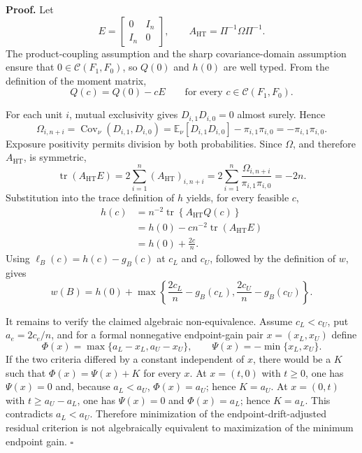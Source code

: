 \textbf{Proof.}
Let
\[
E=\begin{bmatrix}0&I_n\\ I_n&0\end{bmatrix},
\qquad
A_{\mathrm{HT}}=\Pi^{-1}\Omega\Pi^{-1}.
\]
The product-coupling assumption and the sharp covariance-domain assumption ensure that \(0\in\mathcal C(F_1,F_0)\), so \(Q(0)\) and \(h(0)\) are well typed.  From the definition of the moment matrix,
\[
Q(c)=Q(0)-cE
\qquad\text{for every }c\in\mathcal C(F_1,F_0).
\]

For each unit \(i\), mutual exclusivity gives \(D_{i,1}D_{i,0}=0\) almost surely.  Hence
\[
\Omega_{i,n+i}
=\operatorname{Cov}_\nu(D_{i,1},D_{i,0})
=\mathbb E_\nu[D_{i,1}D_{i,0}]-\pi_{i,1}\pi_{i,0}
=-\pi_{i,1}\pi_{i,0}.
\]
Exposure positivity permits division by both probabilities.  Since \(\Omega\), and therefore \(A_{\mathrm{HT}}\), is symmetric,
\[
\operatorname{tr}(A_{\mathrm{HT}}E)
=2\sum_{i=1}^n(A_{\mathrm{HT}})_{i,n+i}
=2\sum_{i=1}^n\frac{\Omega_{i,n+i}}{\pi_{i,1}\pi_{i,0}}
=-2n.
\]
Substitution into the trace definition of \(h\) yields, for every feasible \(c\),
\[
\begin{aligned}
h(c)
&=n^{-2}\operatorname{tr}\!\left\{A_{\mathrm{HT}}Q(c)\right\}\\
&=h(0)-cn^{-2}\operatorname{tr}(A_{\mathrm{HT}}E)\\
&=h(0)+\frac{2c}{n}.
\end{aligned}
\]
Using \(\ell_B(c)=h(c)-g_B(c)\) at \(c_L\) and \(c_U\), followed by the definition of \(w\), gives
\[
w(B)=h(0)+\max\left\{\frac{2c_L}{n}-g_B(c_L),\frac{2c_U}{n}-g_B(c_U)\right\}.
\]

It remains to verify the claimed algebraic non-equivalence.  Assume \(c_L<c_U\), put \(a_e=2c_e/n\), and for a formal nonnegative endpoint-gain pair \(x=(x_L,x_U)\) define
\[
\Phi(x)=\max\{a_L-x_L,a_U-x_U\},
\qquad
\Psi(x)=-\min\{x_L,x_U\}.
\]
If the two criteria differed by a constant independent of \(x\), there would be a \(K\) such that \(\Phi(x)=\Psi(x)+K\) for every \(x\).  At \(x=(t,0)\) with \(t\ge0\), one has \(\Psi(x)=0\) and, because \(a_L<a_U\), \(\Phi(x)=a_U\); hence \(K=a_U\).  At \(x=(0,t)\) with \(t\ge a_U-a_L\), one has \(\Psi(x)=0\) and \(\Phi(x)=a_L\); hence \(K=a_L\).  This contradicts \(a_L<a_U\).  Therefore minimization of the endpoint-drift-adjusted residual criterion is not algebraically equivalent to maximization of the minimum endpoint gain. \(\square\)